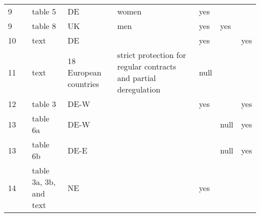 \begin{tabular}{llll>{\raggedright\arraybackslash}p{2in}l>{\raggedright\arraybackslash}p{1in}>{\raggedright\arraybackslash}p{1.5in}}
  9 & \citealp{giesecke_gross_2004} & table 5 & DE & women & yes &  &  \\ 
  9 & \citealp{giesecke_gross_2004} & table 8 & UK & men & yes & yes &  \\ 
  10 & \citealp{hagen_2002} & text & DE &  & yes &  & yes \\ 
  11 & \citealp{hogberg_etal_2019} & text & 18 European countries & strict protection for regular contracts and partial deregulation & null &  &  \\ 
  12 & \citealp{mcginnity_etal_2005} & table 3 & DE-W &  & yes &  & yes \\ 
  13 & \citealp{mertens_mcginnity_2002} & table 6a & DE-W &  &  & null & yes \\ 
  13 & \citealp{mertens_mcginnity_2002} & table 6b & DE-E &  &  & null & yes \\ 
  14 & \citealp{mooi-reci_dekker_2015} & table 3a, 3b, and text & NE &  & yes &  &  \\ 
   \hline 
\end{tabular}

